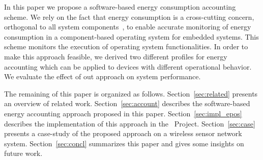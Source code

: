 In this paper we propose a software-based energy consumption accounting scheme.
We rely on the fact that energy consumption is a cross-cutting concern,
orthogonal to all system components~\cite{Lohmann:2005}, to enable accurate
monitoring of energy consumption in a component-based operating system for
embedded systems. This scheme monitors the execution of operating system
functionalities. In order to make this approach feasible, we derived two
different profiles for energy accounting which can be applied to devices with
different operational behavior. We evaluate the effect of out approach on system
performance.

The remaining of this paper is organized as follows.
Section~\ref{sec:related} presents an overview of related work.
Section~\ref{sec:account} describes the software-based energy accounting
approach proposed in this paper.
Section~\ref{sec:impl_epos} describes the implementation of this approach in the
\epos~Project.
Section~\ref{sec:case} presents a case-study of the proposed approach on a
wireless sensor network system.
Section~\ref{sec:concl} summarizes this paper and gives some insights on future
work.
